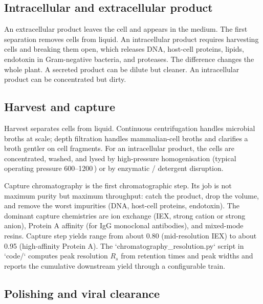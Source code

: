 

\subsection{Intracellular and extracellular product}

An extracellular product leaves the cell and appears in the medium. The
first separation removes cells from liquid. An intracellular product
requires harvesting cells and breaking them open, which releases DNA,
host-cell proteins, lipids, endotoxin in Gram-negative bacteria, and
proteases. The difference changes the whole plant. A secreted product
can be dilute but cleaner. An intracellular product can be concentrated
but dirty.

\subsection{Harvest and capture}

Harvest separates cells from liquid. Continuous centrifugation handles
microbial broths at scale; depth filtration handles mammalian-cell
broths and clarifies a broth gentler on cell fragments. For an
intracellular product, the cells are concentrated, washed, and lysed
by high-pressure homogenisation (typical operating pressure
600--1200\,) or by enzymatic / detergent disruption.

Capture chromatography is the first chromatographic step. Its job is
not maximum purity but maximum throughput: catch the product, drop the
volume, and remove the worst impurities (DNA, host-cell proteins,
endotoxin). The dominant capture chemistries are ion exchange (IEX,
strong cation or strong anion), Protein A affinity (for IgG monoclonal
antibodies), and mixed-mode resins. Capture step yields range from
about 0.80 (mid-resolution IEX) to about 0.95 (high-affinity Protein A).
The `chromatography_resolution.py` script in `code/` computes peak
resolution $R_s$ from retention times and peak widths and reports the
cumulative downstream yield through a configurable train.

\subsection{Polishing and viral clearance}

